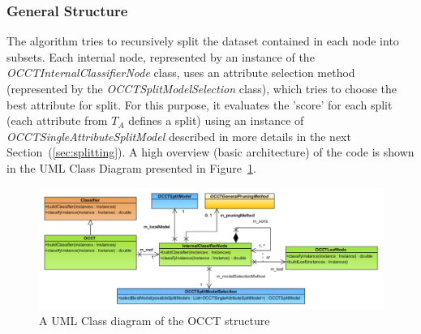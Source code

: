 \documentclass[a4paper,12pt]{article}
\begin{document}
\begin{spacing}{1.5}
\subsubsection{General Structure}
The algorithm tries to recursively split the dataset contained in each node into subsets. Each internal node, represented by an instance of the {\em OCCTInternalClassifierNode} class, uses an attribute selection method (represented by the {\em OCCTSplitModelSelection} class), which tries to choose the best attribute for split. For this purpose, it evaluates the 'score' for each split (each attribute from $T_{A}$ defines a split) using an instance of {\em OCCTSingleAttributeSplitModel} described in more details in the next Section~(\ref{sec:splitting}). A high overview (basic architecture) of the code is shown in the UML Class Diagram presented in Figure~\ref{fig:main}.
\vspace{0.5cm}
\begin{figure}[!h]
    \centering
    \includegraphics[width=1\textwidth]{Figures/ClassDiagrams/PDF/MainStructure.pdf}
    \caption{A UML Class diagram of the OCCT structure}
    \label{fig:main}
\end{figure}


\end{spacing}
\end{document}
